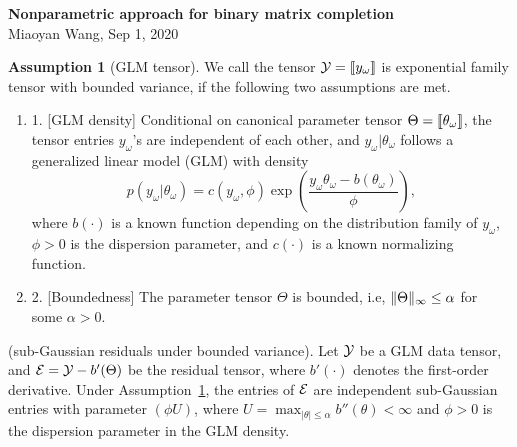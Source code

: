 \documentclass[11pt]{article}
\theoremstyle{plain}
\theoremstyle{definition}
\newtheorem{assumption}{Assumption}
\begin{document}
\begin{center}
{\bf \Large Nonparametric approach for binary matrix completion}\\
Miaoyan Wang, Sep 1, 2020\\
\end{center}


\newpage
\begin{assumption}[GLM tensor]\label{def:GLM}
We call the tensor $\mathcal{Y}=\llbracket y_\omega \rrbracket$ is exponential family tensor with bounded variance, if the following two assumptions are met. 
\begin{enumerate}[leftmargin=-1pt,topsep=0pt,itemsep=0ex,partopsep=0ex,parsep=0ex]
\item []1. [GLM density] Conditional on canonical parameter tensor $\Theta=\llbracket \theta_\omega \rrbracket$, the tensor entries $y_\omega$'s are independent of each other, and $y_\omega|\theta_\omega$ follows a generalized linear model (GLM) with density
\begin{equation}\label{eq:density}
p(y_\omega|\theta_\omega)=c(y_\omega,\phi)\exp\left(\frac{y_\omega \theta_\omega- b(\theta_\omega)}{\phi}\right),
\end{equation}
where $b(\cdot)$ is a known function depending on the distribution family of $y_\omega$, $\phi>0$ is the dispersion parameter, and $c(\cdot)$ is a known normalizing function.
\item []2. [Boundedness] The parameter tensor $\Theta$ is bounded, i.e, $\lVert\Theta\rVert_\infty\leq \alpha$ for some $\alpha>0$. 
\end{enumerate}
\end{assumption}

 (sub-Gaussian residuals under bounded variance).\label{prop}
Let $\mathcal{Y}$ be a GLM data tensor, and $\mathcal{E}=\mathcal{Y}-b'(\Theta)$ be the residual tensor, where $b'(\cdot)$ denotes the first-order derivative. Under Assumption~\ref{def:GLM}, the entries of $\mathcal{E}$ are independent sub-Gaussian entries with parameter $(\phi U)$, where $U=\max_{|\theta|\leq \alpha}b''(\theta)<\infty$ and $\phi>0$ is the dispersion parameter in the GLM density.
\end{document}
